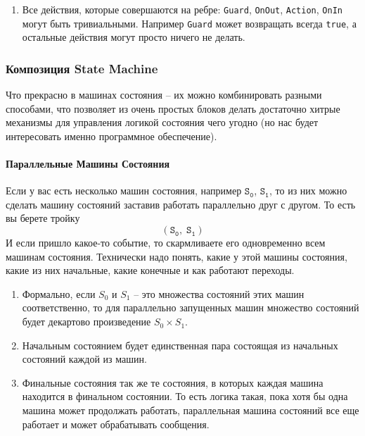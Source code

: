 \documentclass{article}
\begin{document}
{\begin{enumerate}
\item Все действия, которые совершаются на ребре: \verb"Guard", \verb"OnOut", \verb"Action", \verb"OnIn" могут быть тривиальными.
Например \verb"Guard" может возвращать всегда \verb"true", а остальные действия могут просто ничего не делать.
\end{enumerate}

\subsubsection{Композиция State Machine}

Что прекрасно в машинах состояния -- их можно комбинировать разными способами, что позволяет из очень простых блоков делать достаточно хитрые механизмы для управления логикой состояния чего угодно (но нас будет интересовать именно программное обеспечение).

\paragraph{Параллельные Машины Состояния}

Если у вас есть несколько машин состояния, например $\texttt{S}_\texttt{0}$, $\texttt{S}_\texttt{1}$, то из них можно сделать машину состояний заставив работать параллельно друг с другом.
То есть вы берете тройку
\[
(\texttt{S}_\texttt{0},\;\texttt{S}_\texttt{1})
\]
И если пришло какое-то событие, то скармливаете его одновременно всем машинам состояния.
Технически надо понять, какие у этой машины состояния, какие из них начальные, какие конечные и как работают переходы.
\begin{enumerate}
\item Формально, если $S_0$ и $S_1$ -- это множества состояний этих машин соответственно, то для параллельно запущенных машин множество состояний будет декартово произведение $S_0\times S_1$.

\item Начальным состоянием будет единственная пара состоящая из начальных состояний каждой из машин.

\item Финальные состояния так же те состояния, в которых каждая машина находится в финальном состоянии.
То есть логика такая, пока хотя бы одна машина может продолжать работать, параллельная машина состояний все еще работает и может обрабатывать сообщения.


\end{enumerate}}
\end{document}
